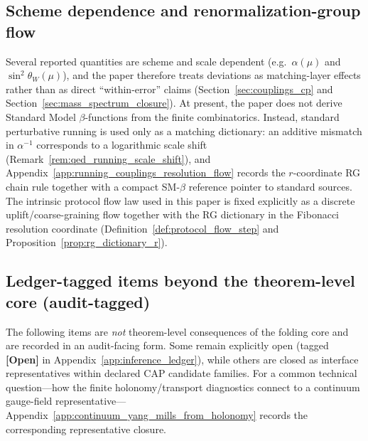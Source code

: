\subsection{Scheme dependence and renormalization-group flow}
Several reported quantities are scheme and scale dependent (e.g.\ $\alpha(\mu)$ and $\sin^2\theta_W(\mu)$), and the paper therefore treats deviations as matching-layer effects rather than as direct ``within-error'' claims (Section~\ref{sec:couplings_cp} and Section~\ref{sec:mass_spectrum_closure}).
At present, the paper does not derive Standard Model $\beta$-functions from the finite combinatorics.
Instead, standard perturbative running is used only as a matching dictionary: an additive mismatch in $\alpha^{-1}$ corresponds to a logarithmic scale shift (Remark~\ref{rem:qed_running_scale_shift}), and Appendix~\ref{app:running_couplings_resolution_flow} records the $r$-coordinate RG chain rule together with a compact SM-$\beta$ reference pointer to standard sources.
The intrinsic protocol flow law used in this paper is fixed explicitly as a discrete uplift/coarse-graining flow together with the RG dictionary in the Fibonacci resolution coordinate (Definition~\ref{def:protocol_flow_step} and Proposition~\ref{prop:rg_dictionary_r}).

\subsection{Ledger-tagged items beyond the theorem-level core (audit-tagged)}
\label{subsec:open_problems_audit_tagged}
The following items are \emph{not} theorem-level consequences of the folding core and are recorded in an audit-facing form.
Some remain explicitly open (tagged \textbf{[Open]} in Appendix~\ref{app:inference_ledger}), while others are closed as interface representatives within declared CAP candidate families.
For a common technical question---how the finite holonomy/transport diagnostics connect to a continuum gauge-field representative---Appendix~\ref{app:continuum_yang_mills_from_holonomy} records the corresponding representative closure.

